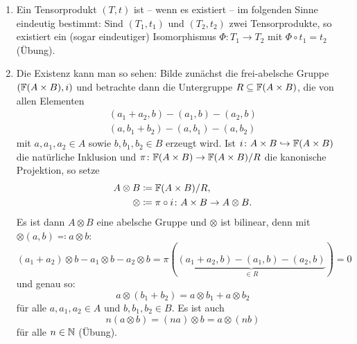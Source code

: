 \begin{kommentar}
  \begin{enumerate}
    \item
      Ein Tensorprodukt $(T,t)$ ist -- wenn es existiert -- im folgenden Sinne eindeutig bestimmt:
      Sind $(T_1,t_1)$ und $(T_2,t_2)$ zwei Tensorprodukte, so existiert ein (sogar eindeutiger) Isomorphismus $\Phi \colon T_1 \to T_2$ mit $\Phi \circ t_1 = t_2$ (Übung).
    \item
      Die Existenz kann man so sehen:
      Bilde zunächst die frei-abelsche Gruppe $(\mathbb{F}(A\times B),i)$ und betrachte dann die Untergruppe $R \subseteq \mathbb{F}(A \times B)$, die von allen Elementen
      \begin{gather*}
        (a_1 + a_2, b) - (a_1,b) - (a_2,b)\\
        (a,b_1 + b_2) - (a,b_1) - (a, b_2)
      \end{gather*}
    mit $a,a_1,a_2 \in A$ sowie $b,b_1,b_2 \in B$ erzeugt wird.
    Ist $i \colon A \times B \hookrightarrow \mathbb{F}(A \times B)$ die natürliche Inklusion und $\pi \colon \mathbb{F}(A \times B) \to \mathbb{F}(A \times B) / R$ die kanonische Projektion, so setze
    \begin{align*}
      A \otimes B & \coloneqq \mathbb{F}(A \times B) / R, \\
      \otimes & \coloneqq \pi \circ i \colon A \times B \to A \otimes B.
    \end{align*}
    Es ist dann $A \otimes B$ eine abelsche Gruppe und $\otimes$ ist bilinear, denn mit $\otimes(a,b) \eqqcolon a \otimes b$:
    \begin{equation*}
      (a_1 + a_2) \otimes b - a_1 \otimes b - a_2 \otimes b = \pi(\underbrace{(a_1 + a_2, b) - (a_1,b) - (a_2,b)}_{\in R}) = 0
    \end{equation*}
    und genau so:
    \begin{equation*}
      a \otimes (b_1+b_2) = a \otimes b_1 + a \otimes b_2
    \end{equation*}
    für alle $a,a_1,a_2 \in A$ und $b,b_1,b_2 \in B$.
    Es ist auch
    \begin{equation*}
      n (a \otimes b) = (na) \otimes b = a \otimes (nb)
    \end{equation*}
    für alle $n \in \mathbb{N}$ (Übung).


\end{enumerate}
\end{kommentar}
